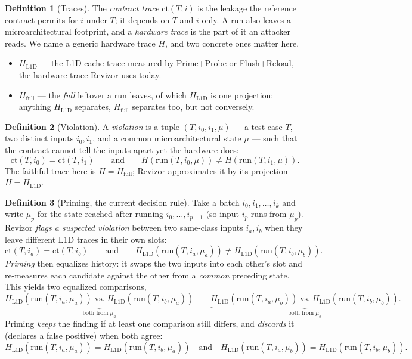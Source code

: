 \documentclass[11pt]{article}
\theoremstyle{definition}
\newtheorem{definition}{Definition}
\theoremstyle{plain}
\newcommand{\ct}{\mathrm{ct}}
\newcommand{\run}{\mathrm{run}}
\newcommand{\HL}{H_{\mathrm{L1D}}}
\newcommand{\HF}{H_{\mathrm{full}}}
\newcommand{\Htr}{H}                     %
\begin{document}
\begin{definition}[Traces]
\label{def:traces}
The \emph{contract trace} $\ct(T,i)$ is the leakage the reference contract permits for
$i$ under $T$; it depends on $T$ and $i$ only. A run also leaves a microarchitectural
footprint, and a \emph{hardware trace} is the part of it an attacker reads. We name a
generic hardware trace $\Htr$, and two concrete ones matter here.
\begin{itemize}[nosep,leftmargin=1.4em]
\item $\HL$ --- the L1D cache trace measured by Prime+Probe or Flush+Reload, the
      hardware trace Revizor uses today.
\item $\HF$ --- the \emph{full} leftover a run leaves, of which $\HL$ is one
      projection: anything $\HL$ separates, $\HF$ separates too, but not conversely.
\end{itemize}
\end{definition}

\begin{definition}[Violation]
\label{def:violation}
A \emph{violation} is a tuple $(T,i_0,i_1,\mu)$ --- a test case $T$, two distinct
inputs $i_0,i_1$, and a common microarchitectural state $\mu$ --- such that the
contract cannot tell the inputs apart yet the hardware does:
\[
  \ct(T,i_0)=\ct(T,i_1)
  \qquad\text{and}\qquad
  \Htr(\run(T,i_0,\mu))\neq \Htr(\run(T,i_1,\mu)).
\]
The faithful trace here is $\Htr=\HF$; Revizor approximates it by its projection
$\Htr=\HL$.
\end{definition}

\begin{definition}[Priming, the current decision rule]
\label{def:prime}
Take a batch $i_0,i_1,\dots,i_k$ and write $\mu_p$ for the state reached after running
$i_0,\dots,i_{p-1}$ (so input $i_p$ runs from $\mu_p$). Revizor \emph{flags a suspected
violation} between two same-class inputs $i_a,i_b$ when they leave different L1D traces
in their own slots:
\[
  \ct(T,i_a)=\ct(T,i_b)
  \qquad\text{and}\qquad
  \HL(\run(T,i_a,\mu_a))\neq \HL(\run(T,i_b,\mu_b)).
\]
\emph{Priming} then equalizes history: it swaps the two inputs into each other's slot
and re-measures each candidate against the other from a \emph{common} preceding state.
This yields two equalized comparisons,
\[
  \underbrace{\HL(\run(T,i_a,\mu_a))\;\text{vs.}\;\HL(\run(T,i_b,\mu_a))}_{\text{both from }\mu_a}
  \qquad
  \underbrace{\HL(\run(T,i_a,\mu_b))\;\text{vs.}\;\HL(\run(T,i_b,\mu_b))}_{\text{both from }\mu_b}.
\]
Priming \emph{keeps} the finding if at least one comparison still differs, and
\emph{discards} it (declares a false positive) when both agree:
\[
  \HL(\run(T,i_a,\mu_a))=\HL(\run(T,i_b,\mu_a))
  \quad\text{and}\quad
  \HL(\run(T,i_a,\mu_b))=\HL(\run(T,i_b,\mu_b)).
\]
\end{definition}
\end{document}
